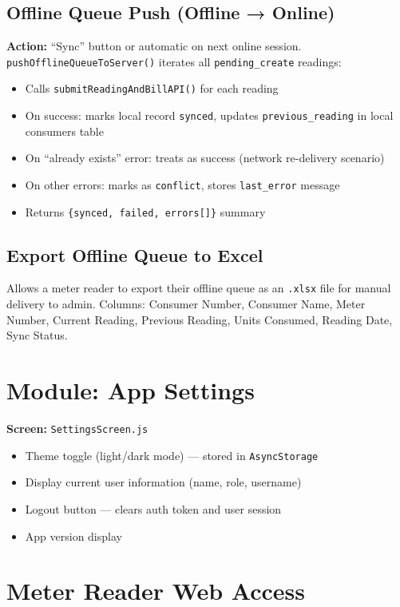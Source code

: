 \documentclass[12pt, a4paper]{report}
\newenvironment{featurelist}{%
    \begin{itemize}[leftmargin=1.5em, itemsep=2pt, parsep=0pt]
}{%
    \end{itemize}
}
\begin{document}
\subsection{Offline Queue Push (Offline → Online)}
\textbf{Action:} ``Sync'' button or automatic on next online session.\\
\texttt{pushOfflineQueueToServer()} iterates all \texttt{pending\_create} readings:
\begin{featurelist}
    \item Calls \texttt{submitReadingAndBillAPI()} for each reading
    \item On success: marks local record \texttt{synced}, updates \texttt{previous\_reading} in local consumers table
    \item On ``already exists'' error: treats as success (network re-delivery scenario)
    \item On other errors: marks as \texttt{conflict}, stores \texttt{last\_error} message
    \item Returns \texttt{\{synced, failed, errors[]\}} summary
\end{featurelist}

\subsection{Export Offline Queue to Excel}
Allows a meter reader to export their offline queue as an \texttt{.xlsx} file for manual delivery to admin. Columns: Consumer Number, Consumer Name, Meter Number, Current Reading, Previous Reading, Units Consumed, Reading Date, Sync Status.

\section{Module: App Settings}

\textbf{Screen:} \texttt{SettingsScreen.js}

\begin{featurelist}
    \item Theme toggle (light/dark mode) — stored in \texttt{AsyncStorage}
    \item Display current user information (name, role, username)
    \item Logout button — clears auth token and user session
    \item App version display
\end{featurelist}

\section{Meter Reader Web Access}
\end{document}
